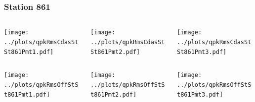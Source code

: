 \documentclass[aspectratio=169]{beamer}
\begin{document}
\begin{frame} 
  \frametitle{Station 861}
  \begin{center}
    \begin{columns}
      \begin{column}{0.33\textwidth}
        \texttt{[image: ../plots/qpkRmsCdasStSt861Pmt1.pdf]}
      \end{column}
      \begin{column}{0.33\textwidth}
        \texttt{[image: ../plots/qpkRmsCdasStSt861Pmt2.pdf]}
      \end{column}
      \begin{column}{0.33\textwidth}
        \texttt{[image: ../plots/qpkRmsCdasStSt861Pmt3.pdf]}
      \end{column}
    \end{columns}
  \end{center}

  \begin{center}
    \begin{columns}
      \begin{column}{0.33\textwidth}
        \texttt{[image: ../plots/qpkRmsOffStSt861Pmt1.pdf]}
      \end{column}
      \begin{column}{0.33\textwidth}
        \texttt{[image: ../plots/qpkRmsOffStSt861Pmt2.pdf]}
      \end{column}
      \begin{column}{0.33\textwidth}
        \texttt{[image: ../plots/qpkRmsOffStSt861Pmt3.pdf]}
      \end{column}
    \end{columns}
  \end{center}
\end{frame}
\end{document}
